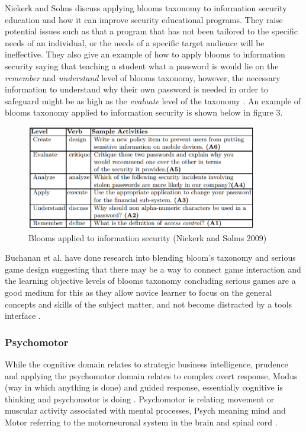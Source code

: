 \documentclass[12pt,a4paper]{article}
\begin{document}
Niekerk and Solms discuss applying blooms taxonomy to information security education and how it can improve security educational programs. They raise potential issues such as that a program that has not been tailored to the specific needs of an individual, or the needs of a specific target audience will be ineffective. They also give an example of how to apply blooms to information security saying that teaching a student what a password is would lie on the \emph{remember} and \emph{understand} level of blooms taxonomy, however, the necessary information to understand  why their own password is needed in order to safeguard might be as high as the \emph{evaluate} level of the taxonomy \cite{van2009using}. An example of blooms taxonomy applied to information security is shown below in figure 3.  
\begin{figure}[h]
    \centering
    \includegraphics[width=0.9\textwidth]{Figs/blooms2.PNG} 
    \caption{Blooms applied to information security (Niekerk and Solms 2009)}
\end{figure} 

Buchanan et al. have done research into blending bloom's taxonomy and serious game design suggesting that there may be a way to connect game interaction and the learning objective levels of blooms taxonomy concluding serious games are a good medium for this as they allow novice learner to focus on the general concepts and skills of the subject matter, and not become distracted by a tools interface \cite{buchanan2011blending2}. 
\subsubsection{Psychomotor} 
While the cognitive domain relates to strategic business intelligence, prudence and applying the psychomotor domain relates to complex overt response, Modus (way in which anything is done) and guided response, essentially cognitive is thinking and psychomotor is doing \cite{schutte2016development}. Psychomotor is relating movement or muscular activity associated with mental processes, Psych meaning mind and Motor referring to the motorneuronal system in the brain and spinal cord \cite{tan2007psychomotor}. 
 
\end{document}
